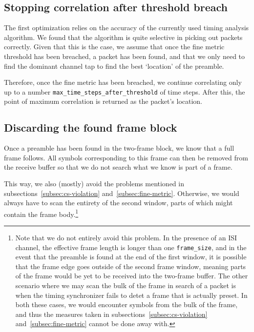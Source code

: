 \subsection{Stopping correlation after threshold breach}

The first optimization relies on the accuracy of the currently used timing
analysis algorithm. We found that the algorithm is quite selective in picking
out packets correctly. Given that this is the case, we assume that once the
fine metric threshold has been breached, a packet has been found, and that we
only need to find the dominant channel tap to find the best `location' of the
preamble.

Therefore, once the fine metric has been breached, we continue correlating only
up to a number \verb+max_time_steps_after_threshold+ of time steps. After this,
the point of maximum correlation is returned as the packet's location.

\subsection{Discarding the found frame block}
\label{subsec:frame-discard}

Once a preamble has been found in the two-frame block, we know that a full
frame follows. All symbols corresponding to this frame can then be removed from
the receive buffer so that we do not search what we know is part of a frame.

This way, we also (mostly) avoid the problems mentioned in
subsections~\ref{subsec:cs-violation} and~\ref{subsec:fine-metric}. Otherwise,
we would always have to scan the entirety of the second window, parts of which
might contain the frame body.\footnote{Note that we do not entirely avoid this
problem. In the presence of an ISI channel, the effective frame length is
longer than one \verb+frame_size+, and in the event that the preamble is found
at the end of the first window, it is possible that the frame edge goes outside
of the second frame window, meaning parts of the frame would be yet to be
received into the two-frame buffer. The other scenario where we may scan the
bulk of the frame in search of a packet is when the timing synchronizer fails
to detet a frame that is actually preset. In both these cases, we would
encounter symbols from the bulk of the frame, and thus the measures taken in
subsections~\ref{subsec:cs-violation} and~\ref{subsec:fine-metric} cannot be
done away with.}


